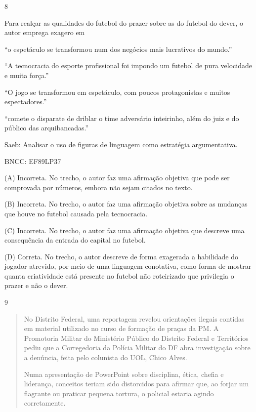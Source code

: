 \num{8}

Para realçar as qualidades do futebol do prazer sobre as do futebol do
dever, o autor emprega exagero em

\begin{escolha}
\item ``o espetáculo se transformou num dos negócios mais lucrativos do
mundo.''

\item ``A tecnocracia do esporte profissional foi impondo um futebol de
pura velocidade e muita força.''

\item ``O jogo se transformou em espetáculo, com poucos protagonistas e
muitos espectadores.''

\item ``comete o disparate de driblar o time adversário inteirinho, além do
juiz e do público das arquibancadas.''
\end{escolha}

Saeb: Analisar o uso de figuras de linguagem como estratégia
argumentativa.

BNCC: EF89LP37

(A) Incorreta. No trecho, o autor faz uma afirmação objetiva que pode
ser comprovada por números, embora não sejam citados no texto.

(B) Incorreta. No trecho, o autor faz uma afirmação objetiva sobre as
mudanças que houve no futebol causada pela tecnocracia.

(C) Incorreta. No trecho, o autor faz uma afirmação objetiva que
descreve uma consequência da entrada do capital no futebol.

(D) Correta. No trecho, o autor descreve de forma exagerada a habilidade
do jogador atrevido, por meio de uma linguagem conotativa, como forma de
mostrar quanta criatividade está presente no futebol não roteirizado que
privilegia o prazer e não o dever.

\num{9}

\begin{quote}
No Distrito Federal, uma reportagem revelou orientações ilegais contidas
em material utilizado no curso de formação de praças da PM. A Promotoria
Militar do Ministério Público do Distrito Federal e Territórios pediu
que a Corregedoria da Polícia Militar do DF abra investigação sobre a
denúncia, feita pelo colunista do UOL, Chico Alves.

Numa apresentação de PowerPoint sobre disciplina, ética, chefia e
liderança, conceitos teriam sido distorcidos para afirmar que, ao forjar
um flagrante ou praticar pequena tortura, o policial estaria agindo
corretamente.
\end{quote}

